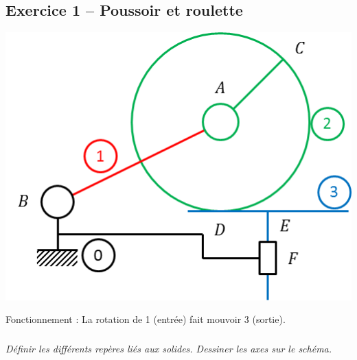 \documentclass[11pt,oneside]{article}
\begin{document}
\subsection*{Exercice 1 -- Poussoir et roulette}
 
\begin{center}
\includegraphics[width=.6\textwidth]{png/fig1_1b} 
\end{center}
Fonctionnement : La rotation de 1 (entrée) fait mouvoir 3 (sortie).

\subparagraph{}
\textit{Définir les différents repères liés aux solides. Dessiner les axes sur le schéma.}

\end{document}
